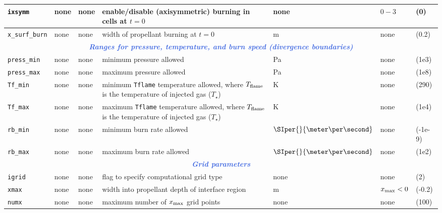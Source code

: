 \begin{small}
\begin{center}
\begin{longtable}[H]{ m{2.2cm} | m{1.0cm} m{1.5cm} | m{5.5cm} | m{1.9cm} | m{2.7cm} m{1.2cm} }
\texttt{ixsymm} & none & none & enable/disable (axisymmetric) burning in cells at $t = 0$ & none & $0-3$ & (0) \\ \hline

\texttt{x\_surf\_burn} & none & none & width of propellant burning at $t = 0$ & m & none & (0.2) \\ \hline

\hline \multicolumn{7}{c}{\textcolor{RoyalBlue}{\textit{\textbf{Ranges for pressure, temperature, and burn speed (divergence boundaries)}}}} \\ \hline \hline

\texttt{press\_min} & none & none & minimum pressure allowed & Pa & none & (1e3) \\ \hline

\texttt{press\_max} & none & none & maximum pressure allowed & Pa & none & (1e8) \\ \hline

\texttt{Tf\_min} & none & none & minimum \texttt{Tflame} temperature allowed, where $T_{\rm flame}$ is the temperature of injected gas ($T_\star$) & K & none & (290) \\ \hline

\texttt{Tf\_max} & none & none & maximum \texttt{Tflame} temperature allowed, where $T_{\rm flame}$ is the temperature of injected gas ($T_\star$) & K & none & (1e4) \\ \hline

\texttt{rb\_min} & none & none & minimum burn rate allowed & $\SIper{}{\meter\per\second}$ & none & (-1e-9) \\ \hline

\texttt{rb\_max} & none & none & maximum burn rate allowed & $\SIper{}{\meter\per\second}$ & none & (1e2) \\ \hline

\hline \multicolumn{7}{c}{\textcolor{RoyalBlue}{\textit{\textbf{Grid parameters}}}} \\ \hline \hline

\texttt{igrid} & none & none & flag to specify computational grid type & none & none & (2) \\ \hline

\texttt{xmax} & none & none & width into propellant depth of interface region & m & $x_{\rm max} < 0$ & (-0.2) \\ \hline

\texttt{numx} & none & none & maximum number of $x_{\rm max}$ grid points & none & none & (100) \\ \hline


\end{longtable}
\end{center}
\end{small}
